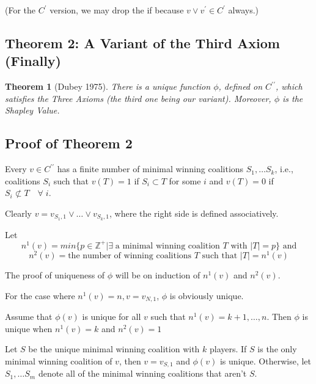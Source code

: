 \documentclass[
paper=128mm:96mm, %
fontsize=11pt, %
pagesize, %
parskip=half-, %
]{scrartcl} %
\theoremstyle{mythmstyle} %
\newtheorem{theorem}{Theorem}[section] %
\begin{document}
(For the $C^{\prime}$ version, we may drop the if because $v \vee v^{\prime} \in C^{\prime}$ always.)

\clearpage

\subsection{Theorem 2: A Variant of the Third Axiom (Finally)}

\begin{theorem}[Dubey 1975]
There is a unique function $\phi$, defined on $C^{\prime\prime}$, which satisfies the Three Axioms (the third one being our variant). Moreover, $\phi$ is the Shapley Value.
\end{theorem}

\clearpage

\subsection*{Proof of Theorem 2}

Every $v \in C^{\prime\prime}$ has a finite number of minimal winning coalitions $S_{1}, \dots S_{k}$, i.e., coalitions $S_{i}$ such that $v(T) = 1$ if $S_{i} \subset T$ for some $i$ and $v(T) = 0$ if $S_{i} \not\subset T \quad \forall \; i$.

Clearly $v = v_{S_{1},1} \vee \dots \vee v_{S_{k},1}$, where the right side is defined associatively.

Let 
\[ n^{1}(v) = min \{p \in \mathbb{Z}^{+} | \exists \; \text{a minimal winning coalition } T \text{ with } |T| = p \} \text{ and}\]
\[n^{2}(v) = \text{the number of winning coalitions } T \text{ such that } |T| = n^{1}(v)\]

\clearpage

The proof of uniqueness of $\phi$ will be on induction of $n^{1}(v)$ and $n^{2}(v)$.

For the case where $n^{1}(v) = n, v = v_{N, 1}$, $\phi$ is obviously unique.

Assume that $\phi(v)$ is unique for all $v$ such that $n^{1}(v) = k + 1, \dots, n$. Then $\phi$ is unique when $n^{1}(v) = k$ and $n^{2}(v) = 1$

Let $S$ be the unique minimal winning coalition with $k$ players. If $S$ is the only minimal winning coalition of $v$, then $v = v_{S,1}$ and $\phi(v)$ is unique. Otherwise, let $S_{1}, \dots S_{m}$ denote all of the minimal winning coalitions that aren't $S$.
\end{document}
